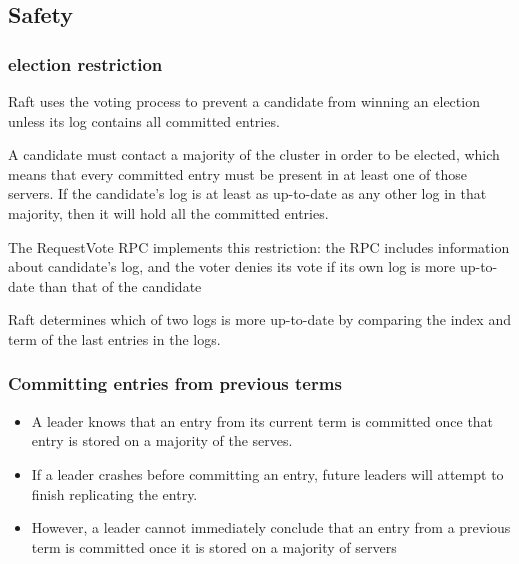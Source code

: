 \documentclass[11pt]{article}
\begin{document}
\subsection{Safety}
\label{sec:org3b2607c}
\subsubsection{election restriction}
\label{sec:org0503ce8}
Raft uses the voting process to prevent a candidate from winning an election unless its log
contains all committed entries.

A candidate must contact a majority of the cluster in order to be elected, which means that
every committed entry must be present in at least one of those servers. If the candidate's log
is at least as up-to-date as any other log in that majority, then it will hold all the committed
entries.

The RequestVote RPC implements this restriction: the RPC includes information about candidate's
log, and the voter denies its vote if its own log is more up-to-date than that of the candidate

Raft determines which of two logs is more up-to-date by comparing the index and term of the last
entries in the logs.
\subsubsection{Committing entries from previous terms}
\label{sec:org8a60107}
\begin{itemize}
\item A leader knows that an entry from its current term is committed once that entry is stored on
a majority of the serves.
\item If a leader crashes before committing an entry, future leaders will attempt to finish
replicating the entry.
\item However, a leader cannot immediately conclude that an entry from a previous term is committed
once it is stored on a majority of servers
\end{itemize}
\end{document}

